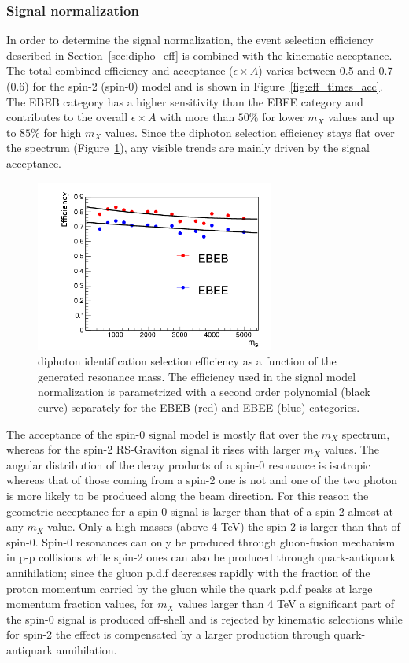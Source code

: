 \subsubsection{Signal normalization}
In order to determine the signal normalization, the event selection efficiency
described in Section~\ref{sec:dipho_eff} is combined with the kinematic acceptance.
The total combined efficiency and acceptance ($\epsilon\times A$)
varies between 0.5 and 0.7 (0.6) for the spin-2 (spin-0) model and is shown in Figure~\ref{fig:eff_times_acc}. The EBEB
category has a higher sensitivity than the EBEE category and contributes to the overall
$\epsilon\times A$ with more than $50\%$ for lower $m_X$ values and up to $85\%$ for high $m_X$ values. Since
the diphoton selection efficiency stays flat over the \mgg spectrum (Figure~\ref{fig:eff_reco_sig}), any
visible trends are mainly driven by the signal acceptance.

\begin{figure}[h!]
  \centering
  \includegraphics[width = 0.7\textwidth]{figures/diphotons/avg_eff_reco.png}
  \caption{diphoton identification selection efficiency as a function of the generated resonance mass.
    The efficiency used in the signal model normalization is parametrized with a second order polynomial (black curve)
    separately for the EBEB (red) and EBEE (blue) categories.}
  \label{fig:eff_reco_sig}
\end{figure}

The acceptance of the spin-0 signal model is mostly flat over the $m_X$ spectrum,
whereas for the spin-2 RS-Graviton signal it rises with larger $m_X$ values.
The angular distribution of the decay products of a spin-0 resonance is isotropic 
whereas that of those coming from a spin-2 one is not and one of the two photon is more likely
to be produced along the beam direction.
For this reason the geometric acceptance for a spin-0 signal is larger than that of a spin-2
almost at any $m_X$ value. Only a high masses (above 4 TeV) the spin-2 is larger than that of spin-0.
Spin-0 resonances can only be produced through gluon-fusion mechanism in p-p collisions while
spin-2 ones can also be produced through quark-antiquark annihilation; since
the gluon p.d.f decreases rapidly with the fraction of the proton momentum carried by the gluon while 
the quark p.d.f peaks at large momentum fraction values, for $m_X$ values larger than 4 TeV a significant
part of the spin-0 signal is produced off-shell and is rejected by kinematic selections while for spin-2
the effect is compensated by a larger production through quark-antiquark annihilation.


